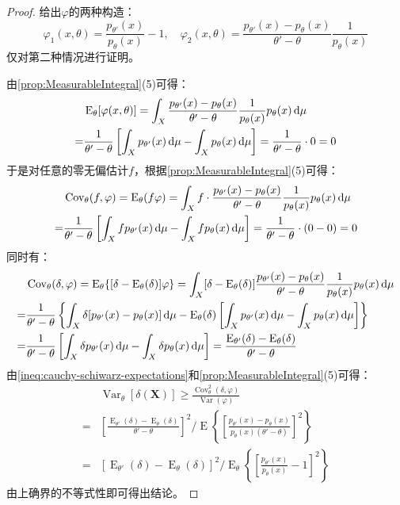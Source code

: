 \begin{proof}
	给出$\varphi$的两种构造：
	\begin{equation*}
		\varphi_1(x,\theta)=\frac{p_{\theta'}(x)}{p_{\theta}(x)}-1,\quad\varphi_2(x,\theta)=\frac{p_{\theta'}(x)-p_{\theta}(x)}{\theta'-\theta}\frac{1}{p_{\theta}(x)}
	\end{equation*}
	仅对第二种情况进行证明。\par
	由\cref{prop:MeasurableIntegral}(5)可得：
	\begin{align*}
		&\operatorname{E}_{\theta}[\varphi(x,\theta)]=\int_{X}\frac{p_{\theta'}(x)-p_{\theta}(x)}{\theta'-\theta}\frac{1}{p_{\theta}(x)}p_{\theta}(x)\mathop{}\!\mathrm{d}\mu \\
		=&\frac{1}{\theta'-\theta}\left[\int_{X}p_{\theta'}(x)\mathop{}\!\mathrm{d}\mu-\int_{X}p_{\theta}(x)\mathop{}\!\mathrm{d}\mu\right]=\frac{1}{\theta'-\theta}\cdot0=0
	\end{align*}
	于是对任意的零无偏估计$f$，根据\cref{prop:MeasurableIntegral}(5)可得：
	\begin{align*}
		&\operatorname{Cov}_{\theta}(f,\varphi)=\operatorname{E}_{\theta}(f\varphi)=\int_{X}f\cdot\frac{p_{\theta'}(x)-p_{\theta}(x)}{\theta'-\theta}\frac{1}{p_{\theta}(x)}p_{\theta}(x)\mathop{}\!\mathrm{d}\mu \\
		=&\frac{1}{\theta'-\theta}\left[\int_{X}fp_{\theta'}(x)\mathop{}\!\mathrm{d}\mu-\int_{X}fp_{\theta}(x)\mathop{}\!\mathrm{d}\mu\right]=\frac{1}{\theta'-\theta}\cdot(0-0)=0
	\end{align*}
	同时有：
	\begin{align*}
		&\operatorname{Cov}_{\theta}(\delta,\varphi)=\operatorname{E}_{\theta}\{[\delta-\operatorname{E}_{\theta}(\delta)]\varphi\}=\int_{X}[\delta-\operatorname{E}_{\theta}(\delta)]\frac{p_{\theta'}(x)-p_{\theta}(x)}{\theta'-\theta}\frac{1}{p_{\theta}(x)}p_{\theta}(x)\mathop{}\!\mathrm{d}\mu \\
		=&\frac{1}{\theta'-\theta}\left\{\int_{X}\delta[p_{\theta'}(x)-p_{\theta}(x)]\mathop{}\!\mathrm{d}\mu-\operatorname{E}_{\theta}(\delta)\left[\int_{X}p_{\theta'}(x)\mathop{}\!\mathrm{d}\mu-\int_{X}p_{\theta}(x)\mathop{}\!\mathrm{d}\mu\right]\right\} \\
		=&\frac{1}{\theta'-\theta}\left[\int_{X}\delta p_{\theta'}(x)\mathop{}\!\mathrm{d}\mu-\int_{X}\delta p_{\theta}(x)\mathop{}\!\mathrm{d}\mu\right]=\frac{\operatorname{E}_{\theta'}(\delta)-\operatorname{E}_{\theta}(\delta)}{\theta'-\theta}
	\end{align*}
	由\cref{ineq:cauchy-schiwarz-expectations}和\cref{prop:MeasurableIntegral}(5)可得：
	\begin{align*}
		&\operatorname{Var}_{\theta}[\delta(\mathbf{X})]\geqslant\frac{\operatorname{Cov}_{\theta}^2(\delta,\varphi)}{\operatorname{Var}(\varphi)} \\
		=&\left[\frac{\operatorname{E}_{\theta'}(\delta)-\operatorname{E}_{\theta}(\delta)}{\theta'-\theta}\right]^2\Big/\operatorname{E}\left\{\left[\frac{p_{\theta'}(x)-p_{\theta}(x)}{p_{\theta}(x)(\theta'-\theta)}\right]^2\right\} \\
		=&[\operatorname{E}_{\theta'}(\delta)-\operatorname{E}_{\theta}(\delta)]^2\Big/\operatorname{E}_{\theta}\left\{\left[\frac{p_{\theta'}(x)}{p_{\theta}(x)}-1\right]^2\right\}
	\end{align*}
	由上确界的不等式性即可得出结论。
\end{proof}
